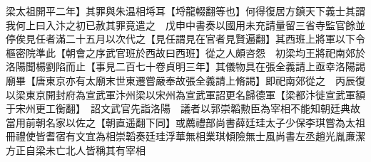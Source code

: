 梁太祖開平二年】其罪與朱温相埓耳【埒龍輟翻等也】何得復居方鎮天下義士其謂我何上曰入汴之初已赦其罪竟遣之　戊申中書奏以國用未充請量留三省寺監官餘並停俟見任者滿二十五月以次代之【見任謂見在官者見賢遍翻】其西班上將軍以下令樞密院準此【朝會之序武官班於西故曰西班】從之人頗咨怨　初梁均王將祀南郊於洛陽聞楊劉陷而止【事見二百七十卷貞明三年】其儀物具在張全義請上亟幸洛陽謁廟畢【唐東京亦有太廟末世東遷嘗嚴奉故張全義請上脩謁】即祀南郊從之　丙辰復以梁東京開封府為宣武軍汴州梁以宋州為宣武軍詔更名歸德軍【梁都汴徙宣武軍額于宋州更工衡翻】　詔文武官先詣洛陽　議者以郭崇韜勲臣為宰相不能知朝廷典故當用前朝名家以佐之【朝直遥翻下同】或薦禮部尚書薛廷珪太子少保李琪嘗為太祖冊禮使皆耆宿有文宜為相崇韜奏廷珪浮華無相業琪傾險無士風尚書左丞趙光胤亷潔方正自梁未亡北人皆稱其有宰相